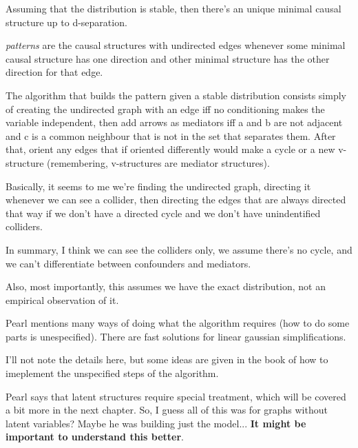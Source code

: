 Assuming that the distribution is stable, then there's an unique minimal causal structure up to d-separation.

\textit{patterns} are the causal structures with undirected edges whenever some minimal causal structure has one direction and other minimal structure has the other direction for that edge.

The algorithm that builds the pattern given a stable distribution consists simply of creating the undirected graph with an edge iff no conditioning makes the variable independent, then add arrows as mediators iff a and b are not adjacent and c is a common neighbour that is not in the set that separates them. After that, orient any edges that if oriented differently would make a cycle or a new  v-structure (remembering, v-structures are mediator structures).

Basically, it seems to me we're finding the undirected graph, directing it whenever we can see a collider, then directing the edges that are always directed that way if we don't have a directed cycle and we don't have unindentified colliders.

In summary, I think we can see the colliders only, we assume there's no cycle, and we can't differentiate between confounders and mediators.

Also, most importantly, this assumes we have the exact distribution, not an empirical observation of it.

Pearl mentions many ways of doing what the algorithm requires (how to do some parts is unespecified). There are fast solutions for linear gaussian simplifications.

I'll not note the details here, but some ideas are given in the book of how to imeplement the unspecified steps of the algorithm.

Pearl says that latent structures require special treatment, which will be covered a bit more in the next chapter. So, I guess all of this was for graphs without latent variables? Maybe he was building just the  model... \textbf{It might be important to understand this better}.

